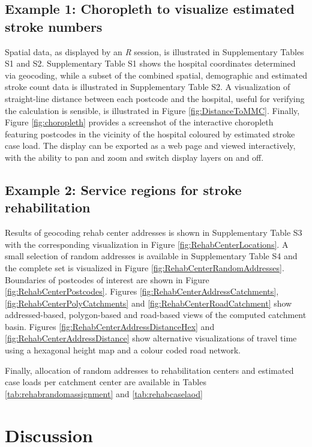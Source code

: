 \documentclass[utf8]{frontiersHLTH}
\begin{document}
\subsection{Example 1: Choropleth to visualize estimated stroke numbers}
Spatial data, as displayed by an {\em R} session, is illustrated in
Supplementary Tables S1 and S2. Supplementary Table
S1 shows the hospital
coordinates determined via geocoding, while a subset of the combined spatial,
demographic and estimated stroke count data is illustrated in Supplementary Table
S2. A visualization of straight-line distance between
each postcode and the hospital, useful for verifying the calculation
is sensible, is illustrated in Figure
\ref{fig:DistanceToMMC}. Finally, Figure \ref{fig:choropleth} provides
a screenshot of the interactive choropleth featuring postcodes in the
vicinity of the hospital coloured by estimated stroke case load. The display
can be exported as a web page and viewed interactively, with the ability to
pan and zoom and switch display layers on and off.

\subsection{Example 2: Service regions for stroke rehabilitation}
Results of geocoding rehab center addresses is shown in Supplementary Table
S3 with the corresponding visualization in Figure
\ref{fig:RehabCenterLocations}. A small selection of random addresses
is available in Supplementary Table S4 and the complete set is
visualized in Figure \ref{fig:RehabCenterRandomAddresses}. Boundaries
of postcodes of interest are shown in Figure
\ref{fig:RehabCenterPostcodes}. Figures
\ref{fig:RehabCenterAddressCatchments},
\ref{fig:RehabCenterPolyCatchments} and \ref{fig:RehabCenterRoadCatchment}
show addressed-based, polygon-based and road-based views of the
computed catchment basin. Figures
\ref{fig:RehabCenterAddressDistanceHex} and
\ref{fig:RehabCenterAddressDistance} show alternative visualizations
of travel time using a hexagonal height map and a colour coded road
network.

Finally, allocation of random addresses to rehabilitation centers and
estimated case loads per catchment center are available in Tables
\ref{tab:rehabrandomassignment} and \ref{tab:rehabcaselaod}

\section{Discussion}\label{discussion}
\end{document}
